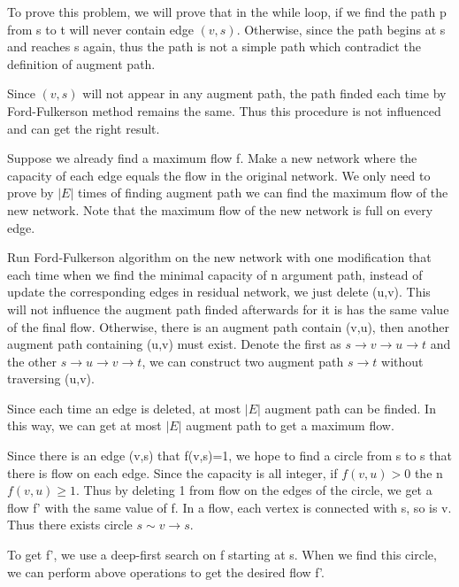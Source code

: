 \begin{cproblem}[26.2.8]
\end{cproblem}
\begin{csolution}
    To prove this problem, we will prove that in the while loop, if we find the path p from s to t will never contain edge $(v,s)$. Otherwise, since the path begins at s and reaches s again, thus the path is not a simple path which contradict the definition of augment path.

    Since $(v,s)$ will not appear in any augment path, the path finded each time by Ford-Fulkerson method remains the same. Thus this procedure is not influenced and can get the right result.

\end{csolution}

\begin{cproblem}[26.2.10]
\end{cproblem}
\begin{csolution}
    Suppose we already find a maximum flow f. Make a new network where the capacity of each edge equals the flow in the original network. We only need to prove by $|E|$ times of finding augment path we can find the maximum flow of the new network. Note that the maximum flow of the new network is full on every edge.

    Run Ford-Fulkerson algorithm on the new network with one modification that each time when we find the minimal capacity of n argument path, instead of update the corresponding edges in residual network, we just delete (u,v). This will not influence the augment path finded afterwards for it is has the same value of the final flow. Otherwise, there is an augment path contain (v,u), then another augment path containing (u,v) must exist. Denote the first as $s\rightarrow v\rightarrow u \rightarrow t$ and the other $s\rightarrow u\rightarrow v\rightarrow t$, we can construct two augment path $s\rightarrow t$ without traversing (u,v).

    Since each time an edge is deleted, at most $|E|$ augment path can be finded. In this way, we can get at most $|E|$ augment path to get a maximum flow.
\end{csolution}

\begin{cproblem}[26.2.12]
\end{cproblem}
\begin{csolution}
    Since there is an edge (v,s) that f(v,s)=1, we hope to find a circle from s to s that there is flow on each edge. Since the capacity is all integer, if $f(v,u)>0$ the n$f(v,u)\geq 1$. Thus by deleting 1 from flow on the edges of the circle, we get a flow f' with the same value of f. In a flow, each vertex is connected with s, so is v. Thus there exists circle $s\sim v\rightarrow s$.

    To get f', we use a deep-first search on f starting at s. When we find this circle, we can perform above operations to get the desired flow f'.
\end{csolution}

